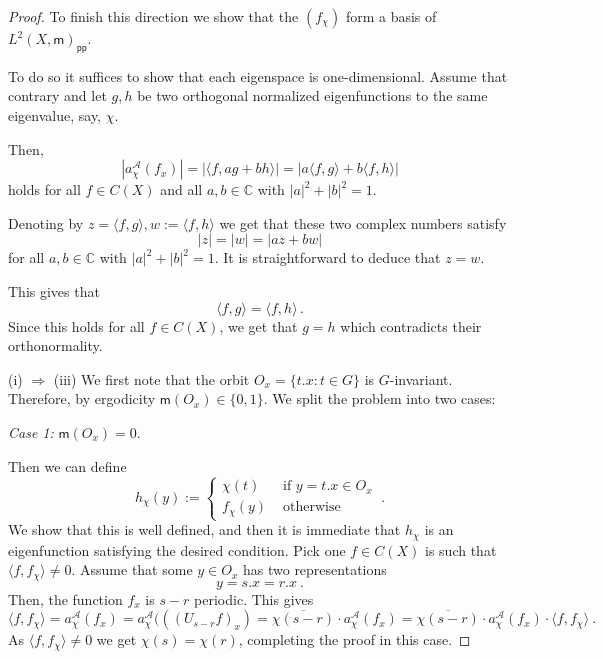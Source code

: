 \documentclass [14pt]{amsart}
\numberwithin{equation}{section}
\newcommand{\CC}{{\mathbb C}}
\newcommand{\cA}{{\mathcal A}}
\newcommand{\mm}{\mathsf{m}}
\begin{document}
\begin{proof}
To finish this direction we show that the $(f_\chi)$ form a basis of $L^2 (X,\mm)_{\mathsf{pp}}$.

To do so it suffices to show that each eigenspace is one-dimensional. Assume that contrary and let $g,h$ be two orthogonal normalized  eigenfunctions to the same eigenvalue, say, $\chi$.

Then,
\[
|a_{\chi}^{\cA} (f_x)| = |\langle f, a g + b h\rangle| = |a \langle f,g\rangle + b \langle f,h\rangle|
\]
holds for all $f\in C(X)$ and all $a,b\in\CC$ with $|a|^2 + |b|^2 =1$.

Denoting by $z=  \langle f,g\rangle, w := \langle f,h\rangle$ we get that these two complex numbers satisfy
\[
|z|=|w|=|az+bw|
\]
for all $a,b \in \CC$ with $|a|^2+|b|^2=1$. It is straightforward to deduce that $z=w$.

This gives that
\[
\langle f,g\rangle = \langle f,h\rangle \,.
\]
Since this holds for all $f \in C(X)$, we get that $g=h$ which contradicts their orthonormality.




\smallskip


\noindent (i) $\Longrightarrow$ (iii) We first note  that the orbit $O_x=\{ t.x :t \in G\}$ is $G$-invariant. Therefore, by ergodicity $\mm(O_x) \in \{ 0,1 \}$. We split the problem into two cases:

{\it Case 1:} $\mm(O_x)=0$.

Then we can define
\[
h_\chi(y):=
\left\{
\begin{array}{cc}
  \chi(t) & \mbox{ if } y =t.x \in O_{x} \\
  f_\chi(y) &\mbox{ otherwise }
\end{array}
\right. \ .
\]
We show that this is well defined, and then it is immediate that $h_\chi$ is an eigenfunction satisfying the desired condition.
Pick one $f \in C(X)$ is such that $\langle f, f_\chi \rangle \neq 0$.
Assume that some $y \in O_{x}$ has two representations
\[
y=s.x = r.x \ .
\]
Then, the function $f_x$ is $s-r$ periodic. This gives
\[
\langle f, f_\chi \rangle = a_{\chi}^\cA(f_x)= a_{\chi}^\cA( ((U_{s-r} f)_x)= \overline{\chi(s-r)} \cdot a_{\chi}^\cA(f_x)= \overline{\chi(s-r)} \cdot a_{\chi}^\cA(f_x) \cdot \langle f, f_\chi \rangle \ .
\]
As $\langle f, f_\chi \rangle \neq 0$ we get $\chi(s)=\chi(r)$, completing the proof in this case.


\end{proof}
\end{document}
